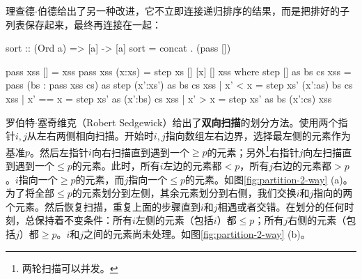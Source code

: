 \documentclass[b5paper]{ctexart}
\begin{document}
理查德$\cdot$伯德给出了另一种改进\cite{fp-pearls}，它不立即连接递归排序的结果，而是把排好的子列表保存起来，最终再连接在一起：

\begin{Haskell}
sort :: (Ord a) => [a] -> [a]
sort = concat . (pass [])

pass xss [] = xss
pass xss (x:xs) = step xs [] [x] [] xss where
    step [] as bs cs xss = pass (bs : pass xss cs) as
    step (x':xs') as bs cs xss | x' <  x = step xs' (x':as) bs cs xss
                               | x' == x = step xs' as (x':bs) cs xss
                               | x' >  x = step xs' as bs (x':cs) xss
\end{Haskell}

罗伯特$\cdot$塞奇维克（Robert Sedgewick）给出了\textbf{双向扫描}的划分方法\cite{qsort-impl}\cite{Bentley}。使用两个指针$i, j$从左右两侧相向扫描。开始时$i, j$指向数组左右边界，选择最左侧的元素作为基准$p$。然后左指针$i$向右扫描直到遇到一个$\geq p$的元素；另外\footnote{两轮扫描可以并发。}右指针$j$向左扫描直到遇到一个$\leq p$的元素。此时，所有$i$左边的元素都$< p$，所有$j$右边的元素都$> p$。$i$指向一个$\geq p$的元素，而$j$指向一个$\leq p$的元素。如图\cref{fig:partition-2-way} (a)。为了将全部$\leq p$的元素划分到左侧，其余元素划分到右侧，我们交换$i$和$j$指向的两个元素。然后恢复扫描，重复上面的步骤直到$i$和$j$相遇或者交错。在划分的任何时刻，总保持着不变条件：所有$i$左侧的元素（包括$i$）都$\leq p$；所有$j$右侧的元素（包括$j$）都$\geq p$。$i$和$j$之间的元素尚未处理。如图\cref{fig:partition-2-way} (b)。
\end{document}
